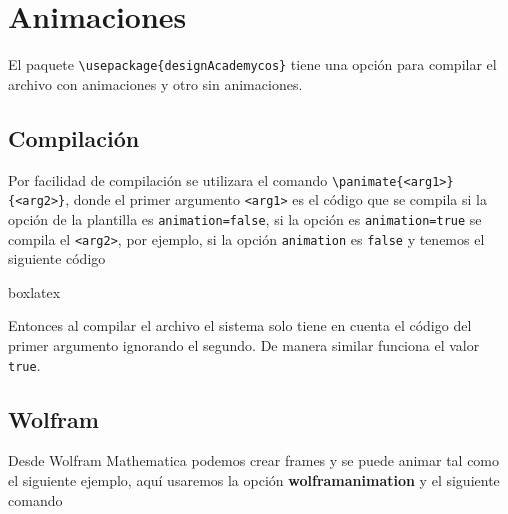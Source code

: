 {\justifying
\chapter{Animaciones}\label{cap:Animaciones}
%
	El paquete \verb|\usepackage{designAcademycos}| tiene una opción para compilar el archivo con animaciones y otro sin animaciones.
	\section{Compilación}
	Por facilidad de compilación se utilizara el comando \verb|\panimate{<arg1>}{<arg2>}|, donde el primer argumento \verb|<arg1>| es el código que se compila si la opción de la plantilla es \verb|animation=false|, si la opción es \verb|animation=true| se compila el \verb|<arg2>|, por ejemplo, si la opción \verb|animation| es \verb|false| y tenemos el siguiente código
		\begin{tcblisting}{boxlatex}
		\end{tcblisting}
		Entonces al compilar el archivo el sistema solo tiene en cuenta el código del primer argumento ignorando el segundo. De manera similar funciona el valor \verb|true|.
	\section{Wolfram}
	Desde Wolfram Mathematica podemos crear frames y se puede animar tal como el siguiente ejemplo, aquí usaremos la opción \textbf{wolframanimation} y el siguiente comando
	
}
